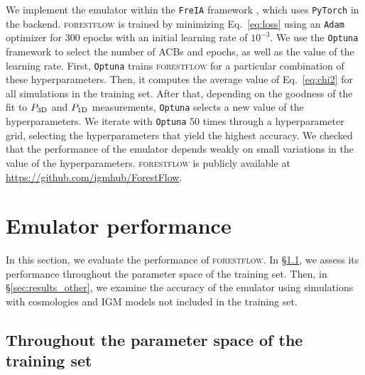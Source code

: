 \documentclass[longauth]{aa}
\newcommand{\poned}{\ensuremath{P_{\rm 1D}}\xspace}
\newcommand{\pthreed}{\ensuremath{P_{\rm 3D}}\xspace}
\newcommand{\forestflow}{\textsc{forestflow}\xspace}
\begin{document}
We implement the emulator within the \texttt{FreIA} framework \citep{freia}, which uses \texttt{PyTorch} \citep{Ansel_PyTorch_2_Faster_2024} in the backend.  \forestflow is trained by minimizing Eq.~\ref{eq:loss} using an \texttt{Adam} optimizer \citep{adam_Diederik2015} for 300 epochs with an initial learning rate of $10^{-3}$. We use the \texttt{Optuna} framework \citep{optuna_2019} to select the number of ACBs and epochs, as well as the value of the learning rate. First, \texttt{Optuna} trains \forestflow for a particular combination of these hyperparameters. Then, it computes the average value of Eq.~\ref{eq:chi2} for all simulations in the training set. After that, depending on the goodness of the fit to \pthreed and \poned measurements, \texttt{Optuna} selects a new value of the hyperparameters. We iterate with \texttt{Optuna} 50 times through a hyperparameter grid, selecting the hyperparameters that yield the highest accuracy. We checked that the performance of the emulator depends weakly on small variations in the value of the hyperparameters. \forestflow is publicly available at \url{https://github.com/igmhub/ForestFlow}.


\section{Emulator performance}
\label{sec:results}


In this section, we evaluate the performance of \forestflow. In \S\ref{sec:results_statistics}, we assess its performance throughout the parameter space of the training set. Then, in \S\ref{sec:results_other}, we examine the accuracy of the emulator using simulations with cosmologies and IGM models not included in the training set.


\subsection{Throughout the parameter space of the training set}
\label{sec:results_statistics}
\end{document}
